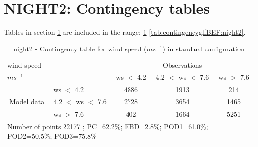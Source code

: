 \section{NIGHT2: Contingency tables}\label{sec:night2:cont}
Tables in section \ref{sec:night2:cont} are included in the range: \ref{tab:contingencywsBEF:night2}-\ref{tab:contingencyglfBEF:night2}.
\begin{table}[h!]
\begin{center}
\begin{tabular}{llccc}
\hline
{wind speed}                                       &                                                    & \multicolumn{3}{c}{Observations}                 \\
{$m s^{-1}$}                                       &                             & ws $<$ 4.2   & 4.2 $<$ ws $<$ 7.6 & ws $>$ 7.6 \\
\hline
\multicolumn{1}{c}{\multirow{3}{*}{Model data}}  & ws $<$ 4.2             & 4886                & 1913                       & 214              \\
                                                 & 4.2  $<$ ws $<$ 7.6 & 2728                & 3654                       & 1465              \\
                                                 & ws $>$ 7.6             & 402                & 1664                       & 5251              \\
\hline 
\multicolumn{5}{l}{ Number of points        22177 ; PC=62.2\%; EBD=2.8\%; POD1=61.0\%; POD2=50.5\%; POD3=75.8\%}                 \\
\end{tabular}
\end{center}
\caption{night2 - Contingency table for {wind speed} ($m s^{-1}$) in standard configuration}
\label{tab:contingencywsBEF:night2}
\end{table}
